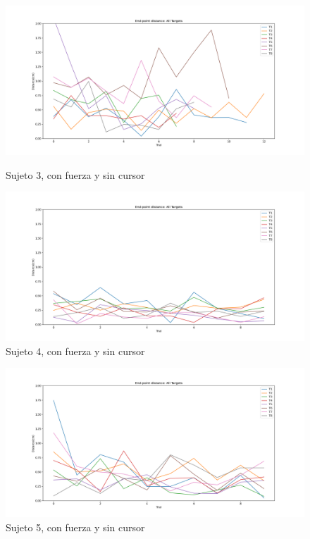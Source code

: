 \documentclass[a4paper,11pt, oneside]{book}
\begin{document}
\begin{figure}[H]
	\begin{minipage}[b]{0.5\linewidth}
		\centering
		\includegraphics[width=\linewidth]{sujeto3/force_no_cursor/evolution_distance}
		\caption{Sujeto 3, con fuerza y sin cursor}
		\label{fig:figura1}
	\end{minipage}
	\hspace{0.5cm}
	\begin{minipage}[b]{0.5\linewidth}
		\centering
		\includegraphics[width=\linewidth]{sujeto4/force_no_cursor/evolution_distance}
		\caption{Sujeto 4, con fuerza y sin cursor}
		\label{fig:figura2}
	\end{minipage}
\end{figure}
\begin{figure}[H]
	\begin{minipage}[b]{0.5\linewidth}
		\centering
		\includegraphics[width=\linewidth]{sujeto5/force_no_cursor/evolution_distance}
		\caption{Sujeto 5, con fuerza y sin cursor}
		\label{fig:figura1}
	\end{minipage}
\end{figure}
\end{document}

